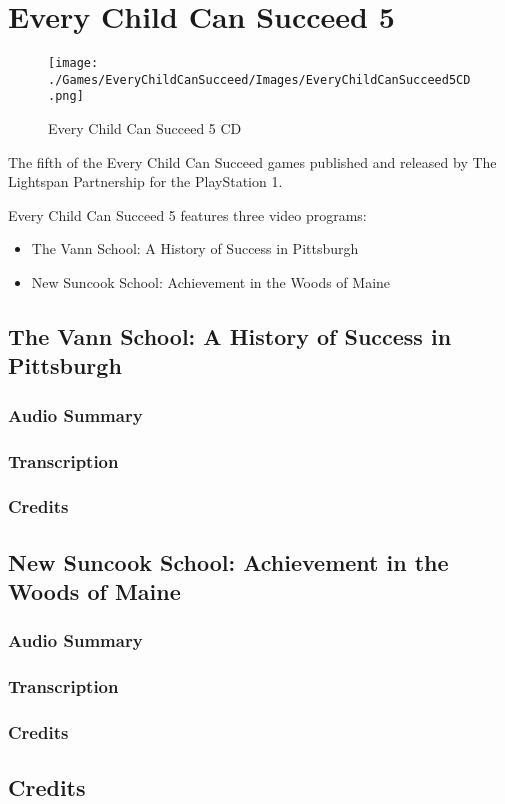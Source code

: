 \chapter{Every Child Can Succeed 5}

\begin{figure}[H]
    \centering
    \texttt{[image: ./Games/EveryChildCanSucceed/Images/EveryChildCanSucceed5CD.png]}
    \caption{Every Child Can Succeed 5 CD}
\end{figure}

The fifth of the Every Child Can Succeed games published and released by The Lightspan Partnership for the PlayStation 1.

Every Child Can Succeed 5 features three video programs:

\begin{itemize}
    \item The Vann School: A History of Success in Pittsburgh
    \item New Suncook School: Achievement in the Woods of Maine
\end{itemize}

\clearpage
\newpage

\section{The Vann School: A History of Success in Pittsburgh}

\subsection{Audio Summary}

\subsection{Transcription}

\subsection{Credits}

\section{New Suncook School: Achievement in the Woods of Maine}

\subsection{Audio Summary}

\subsection{Transcription}

\subsection{Credits}

\section{Credits}